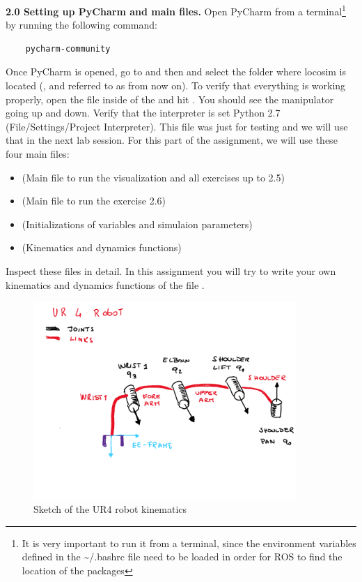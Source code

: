 \documentclass[11pt]{article}
\begin{document}
\textbf{2.0 Setting up PyCharm and main files.} Open PyCharm from a terminal\footnote{It is very important to run it from a terminal, since the environment variables defined in the \textasciitilde/.bashrc file need to be loaded in order for ROS to find the location of the packages} by running the following command:
%
\begin{verbatim}
	pycharm-community
\end{verbatim}
%
Once PyCharm is opened, go to  and then  and select the folder where locosim is located (, and referred to as  from now on). To verify that everything is working properly, open the file   inside of the  and hit . You should see the manipulator going up and down. 
Verify that the interpreter is set Python 2.7 (File/Settings/Project Interpreter).
This file was just for testing and we will use that in  the next lab session.
%
%
For this part of the assignment, we will use these four main files: 
\begin{itemize}
	\item {} (Main file to run the visualization and all exercises up to 2.5)
	\item {} (Main file to run the exercise 2.6)
	\item {} (Initializations of variables and simulaion parameters)
	\item {} (Kinematics and dynamics functions)
\end{itemize}
Inspect these files in detail. In this assignment you will try to write your own kinematics and dynamics functions of the file .\\


\begin{figure}[bht]
	\centering
	\includegraphics[width=10cm]{pics/ur4_Robot.pdf}
	\caption{Sketch of the UR4 robot kinematics}
	\label{fig:ur4_robot_kinematics}
\end{figure} 
\end{document}
